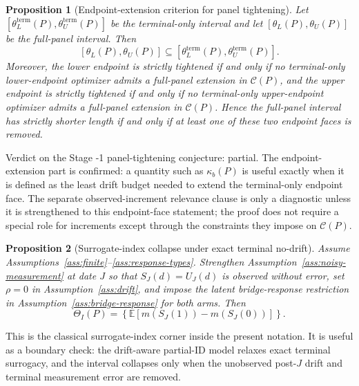 \documentclass[11pt]{article}
\newcommand{\E}{\mathbb{E}}
\theoremstyle{definition}
\theoremstyle{plain}
\newtheorem{proposition}{Proposition}
\theoremstyle{remark}
\begin{document}
\begin{proposition}[Endpoint-extension criterion for panel tightening]\label{prop:endpoint-extension}
Let \([\theta_L^{\mathrm{term}}(P),\theta_U^{\mathrm{term}}(P)]\) be the terminal-only interval and let \([\theta_L(P),\theta_U(P)]\) be the full-panel interval.  Then
\[
  [\theta_L(P),\theta_U(P)]
  \subseteq
  [\theta_L^{\mathrm{term}}(P),\theta_U^{\mathrm{term}}(P)].
\]
Moreover, the lower endpoint is strictly tightened if and only if no terminal-only lower-endpoint optimizer admits a full-panel extension in \(\mathcal C(P)\), and the upper endpoint is strictly tightened if and only if no terminal-only upper-endpoint optimizer admits a full-panel extension in \(\mathcal C(P)\).  Hence the full-panel interval has strictly shorter length if and only if at least one of these two endpoint faces is removed.
\end{proposition}

Verdict on the Stage -1 panel-tightening conjecture: partial.  The endpoint-extension part is confirmed: a quantity such as \(\kappa_b(P)\) is useful exactly when it is defined as the least drift budget needed to extend the terminal-only endpoint face.  The separate observed-increment relevance clause is only a diagnostic unless it is strengthened to this endpoint-face statement; the proof does not require a special role for increments except through the constraints they impose on \(\mathcal C(P)\).

\begin{proposition}[Surrogate-index collapse under exact terminal no-drift]\label{prop:point-collapse}
Assume Assumptions~\ref{ass:finite}--\ref{ass:response-types}.  Strengthen Assumption~\ref{ass:noisy-measurement} at date \(J\) so that \(S_J(d)=U_J(d)\) is observed without error, set \(\rho=0\) in Assumption~\ref{ass:drift}, and impose the latent bridge-response restriction in Assumption~\ref{ass:bridge-response} for both arms.  Then
\[
  \Theta_I(P)
  =
  \left\{
    \E[m(S_J(1))-m(S_J(0))]
  \right\}.
\]
\end{proposition}

This is the classical surrogate-index corner inside the present notation.  It is useful as a boundary check: the drift-aware partial-ID model relaxes exact terminal surrogacy, and the interval collapses only when the unobserved post-\(J\) drift and terminal measurement error are removed.
\end{document}
